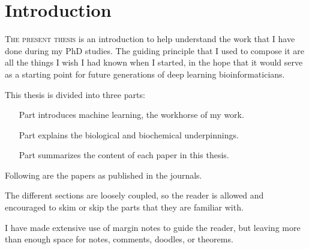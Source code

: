 \chapter{Introduction}

\lettrine[lines=3, lhang=0.25,  nindent=0em, findent=2pt]{\color{Maroon}T}{he present thesis}
is an introduction to help understand the work that I have done during my PhD studies.
The guiding principle that I used to compose it are all the things I wish I had known when I started, in the hope that it would serve as a starting point for future generations of deep learning bioinformaticians.

This thesis is divided into three parts:

\begin{itemize}
	\item[Part \color{Maroon}{I}] introduces machine learning, the workhorse of my work.
	\item[Part \color{Maroon}{II}] explains the biological and biochemical underpinnings.
	\item[Part \color{Maroon}{III}] summarizes the content of each paper in this thesis.
\end{itemize}

Following are the papers as published in the journals.

The different sections are loosely coupled, so the reader is allowed and encouraged to skim or skip the parts that they are familiar with.

I have made extensive use of margin notes to guide the reader, but leaving more than enough space for notes, comments, doodles, or theorems.

